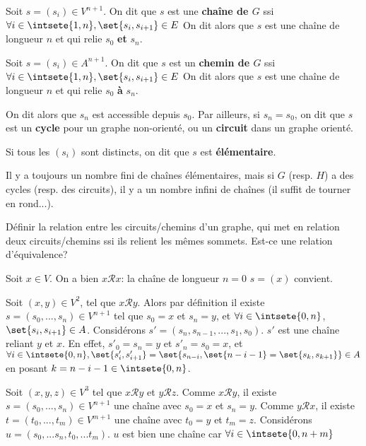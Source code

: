 \documentclass{scrartcl}
\begin{document}
			 Soit $s = (s_i)\in V^{n+1}$. 
			On dit que $s$ est une \textbf{chaîne de $G$} ssi
			$\forall i \in \intsete{1,n}, \set{s_i, s_{i+1}} \in E$
			On dit alors que $s$ est une chaîne de longueur $n$ et qui relie $s_0$ \textbf{et} $s_n$.

			 Soit $s = (s_i)\in A^{n+1}$. 
			On dit que $s$ est un \textbf{chemin de $G$} ssi
			$\forall i \in \intsete{1,n}, \set{s_i, s_{i+1}} \in E$	
			On dit alors que $s$ est une chaîne de longueur $n$ et qui relie $s_0$ \textbf{à} $s_n$.

			On dit alors que $s_n$ est accessible depuis $s_0$.
			Par ailleurs, si $s_n = s_0$, on dit que $s$ est un \textbf{cycle} pour un graphe non-orienté, 
			ou un \textbf{circuit} dans un graphe orienté.

			Si tous les $(s_i)$ sont distincts, on dit que $s$ est \textbf{élémentaire}. 

			\rem Il y a toujours un nombre fini de chaînes élémentaires, mais si $G$ (resp. $H$) a des cycles (resp. des circuits),
			il y a un nombre infini de chaînes (il suffit de tourner en rond...).

			\exo Définir la relation entre les circuits/chemins d'un graphe, 
			qui met en relation deux circuits/chemins ssi ils relient les mêmes sommets.
			Est-ce une relation d'équivalence?

			\begin{demo}
				\item Soit $x \in V$. On a bien $x\mathcal{R}x$: la chaîne de longueur $n=0$ $s = (x)$ convient.
				\item Soit $(x,y) \in V^2$, tel que $x \mathcal{R}y$. 
					Alors par définition il existe $s = (s_0,...,s_n) \in V^{n+1}$ tel que $s_0 = x$ et $s_n = y$,
					et $\forall i \in \intsete{0,n}$, $\set{s_i,s_{i+1}} \in A$.
					Considérons $s' = (s_n,s_{n-1},...,s_1,s_0)$. $s'$ est une chaîne reliant $y$ et $x$.
					En effet, $s'_0 = s_n = y$ et $s'_n = s_0 = x$, et $\forall i \in \intsete{0,n}, 
					\set{s'_{i},s'_{i+1}} = \set{s_{n-i},\set{n-i-1} = \set{s_k,s_{k+1}}} \in A$ en posant $k = n-i-1 \in \intsete{0,n}$.
				\item Soit $(x,y,z) \in V^3$ tel que $x\mathcal{R}y$ et $y\mathcal{R}z$.
					Comme $x\mathcal{R}y$, il existe $s = (s_0,...,s_n) \in V^{n+1}$ une chaîne avec $s_0 = x$ et $s_n = y$.
					Comme $y\mathcal{R}x$, il existe $t = (t_0,...,t_m) \in V^{m+1}$ une chaîne avec $t_0 = y$ et $t_m = z$.
					Considérons $u = (s_0,...s_n,t_0,...t_m)$.
					$u$ est bien une chaîne car $\forall i \in \intsete{0,n+m}$
			\end{demo}
\end{document}
